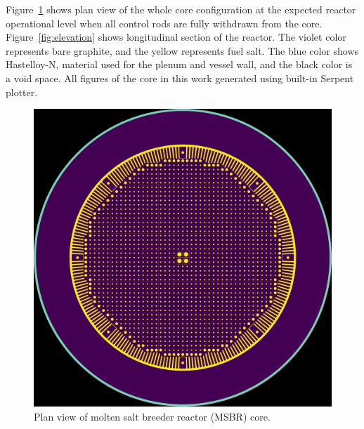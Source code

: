 \documentclass{anstrans}
\begin{document}
Figure~\ref{fig:plan} shows plan view of the whole core configuration at the expected reactor operational level when all control rods are fully withdrawn from the core.  Figure~\ref{fig:elevation} shows longitudinal section of the reactor. The violet color represents bare graphite, and the yellow represents fuel salt. The blue color shows Hastelloy-N, material used for the plenum and vessel wall, and the black color is a void space. All figures of the core in this work generated using built-in Serpent plotter.
\begin{figure}[ht] %
  \centering
  \captionsetup{justification=centering}
  \includegraphics[width=1\linewidth]{figure_2_1.png}
  \caption{Plan view of molten salt breeder reactor (MSBR) core.}
  \label{fig:plan}
\end{figure}
\end{document}
